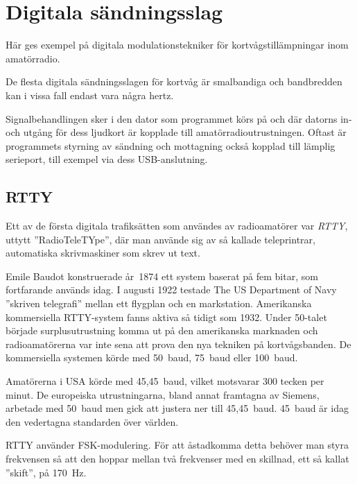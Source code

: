 \section{Digitala sändningsslag}

Här ges exempel på digitala modulationstekniker för kortvågstillämpningar inom
amatörradio.

De flesta digitala sändningsslagen för kortvåg är smalbandiga och bandbredden
kan i vissa fall endast vara några hertz.

Signalbehandlingen sker i den dator som programmet körs på och där datorns
in- och utgång för dess ljudkort är kopplade till amatörradioutrustningen.
Oftast är programmets styrning av sändning och mottagning också kopplad till
lämplig serieport, till exempel via dess USB-anslutning.

\subsection{RTTY}

\begin{historiabox}
Ett av de första digitala trafiksätten som användes av radioamatörer var
\emph{RTTY}, uttytt ''RadioTeleTYpe'', där man använde sig av så kallade
teleprintrar, automatiska skrivmaskiner som skrev ut text.

Emile Baudot konstruerade år~1874 ett system baserat på fem bitar,
som fortfarande används idag.
I augusti 1922 testade The US Department of Navy ''skriven telegrafi'' mellan
ett flygplan och en markstation.
Amerikanska kommersiella RTTY-system fanns aktiva så tidigt som 1932.
Under 50-talet började surplusutrustning komma ut på den amerikanska
marknaden och radioamatörerna var inte sena att prova den nya tekniken på
kortvågsbanden.
De kommersiella systemen körde med 50~baud, 75~baud eller 100~baud.

Amatörerna i USA körde med 45,45~baud, vilket motsvarar 300 tecken per minut.
De europeiska utrustningarna, bland annat framtagna av Siemens, arbetade med
50~baud men gick att justera ner till 45,45~baud.
45~baud är idag den vedertagna standarden över världen.
\end{historiabox}

RTTY använder FSK-modulering.
För att åstadkomma detta behöver man styra frekvensen så att den hoppar mellan
två frekvenser med en skillnad, ett så kallat ''skift'', på \qty{170}{\hertz}.

